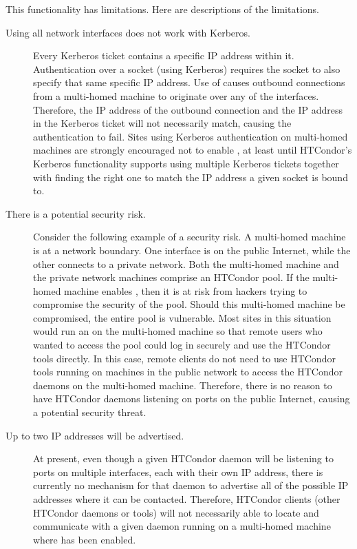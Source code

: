 This functionality has limitations.
Here are descriptions of the limitations.

\begin{description}

\item[Using all network interfaces does not work with Kerberos.] 
  Every Kerberos ticket contains a specific IP address within it.
  Authentication over a socket (using Kerberos) requires
  the socket to also specify that same specific IP address.
  Use of  causes outbound
  connections from a multi-homed machine to 
  originate over any of the interfaces.
  Therefore, the IP address of the outbound connection and the IP
  address in the Kerberos ticket will not necessarily match,
  causing the authentication to fail.
  Sites using Kerberos authentication on multi-homed machines are
  strongly encouraged not to enable ,
  at least until HTCondor's Kerberos functionality
  supports using multiple Kerberos tickets together with finding the right one
  to match the IP address a given socket is bound to. 

\item[There is a potential security risk.]
  Consider the following example of a security risk.
  A multi-homed machine is at a network boundary.
  One interface is on the public Internet, while the other connects to
  a private network.
  Both the multi-homed machine and the private network machines
  comprise an HTCondor pool.
  If the multi-homed machine enables ,
  then it is at risk from hackers trying to compromise the security of the pool.
  Should this multi-homed machine be compromised,
  the entire pool is vulnerable.
  Most sites in this situation would run an  on the
  multi-homed machine so that remote users who wanted to access the
  pool could log in securely and use the HTCondor tools directly.
  In this case, remote clients do not need to use HTCondor tools running
  on machines in the public network to access the HTCondor daemons on
  the multi-homed machine.
  Therefore, there is no reason to have HTCondor daemons listening on
  ports on the public Internet, causing a potential security threat.

\item[Up to two IP addresses will be advertised.]
  At present, even though a given HTCondor daemon will be listening to
  ports on multiple interfaces, each with their own IP address,
  there is currently no mechanism for that daemon to advertise all of
  the possible IP addresses where it can be contacted.
  Therefore, HTCondor clients (other HTCondor daemons or tools) will not
  necessarily able to locate and communicate with a given daemon
  running on a multi-homed machine where
   has been enabled.


\end{description}
